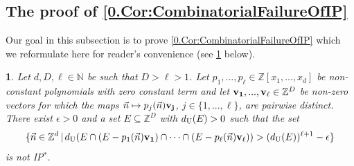 \documentclass[11pt,american,preprint]{elsarticle}
\numberwithin{equation}{section}
\theoremstyle{plain}
\theoremstyle{plain*}
\theoremstyle{plain}
\theoremstyle{plain*}
\theoremstyle{plain}
\theoremstyle{plain*}
\theoremstyle{remark}
\theoremstyle{remark*}
\theoremstyle{remark}
\theoremstyle{remark*}
\theoremstyle{remark}
\theoremstyle{remark*}
\theoremstyle{plain}
\newtheorem{cor}[thm]{\protect\corollaryname}
\providecommand{\corollaryname}{Corollary}
\theoremstyle{definition}
\theoremstyle{plain}
\theoremstyle{plain} %
\newcommand{\N}{\mathbb{N}}
\newcommand{\Z}{\mathbb{Z}}
\begin{document}
\subsection{The proof of \cref{0.Cor:CombinatorialFailureOfIP}}\label{Sec:9.1}
Our goal in this subsection is to prove \cref{0.Cor:CombinatorialFailureOfIP} which we reformulate here for reader's convenience (see \cref{9.Cor:CombinatorialFailureOfIP} below).
\begin{cor}\label{9.Cor:CombinatorialFailureOfIP}
    Let $d,D,\ell\in\N$  be such that $D>\ell>1$. Let $p_1,...,p_\ell\in\Z[x_1,...,x_d]$ be  non-constant polynomials with zero constant term and 
    let ${\bf v_1},...,{\bf v_\ell}\in\Z^D$ be non-zero vectors for which  the  maps $\vec n\mapsto p_j(\vec n){\bf v_j}$, $j\in\{1,...,\ell\}$, are pairwise distinct.
    There exist $\epsilon>0$ and a set $E\subseteq \Z^D$ with $d_{{\rm U}}(E)>0$ such that the set 
    \begin{equation}\label{9.eq:InverseFurstenberg}
\{\vec n\in\Z^d\,|\,d_{{\rm U}}(E\cap (E-p_1(\vec n){\bf v_1})\cap\cdots\cap (E-p_\ell(\vec n){\bf v_\ell}))>(d_{{\rm U}}(E))^{\ell+1}-\epsilon\}
    \end{equation}
    is not {\rm IP$^*$}.  
\end{cor}
\end{document}
